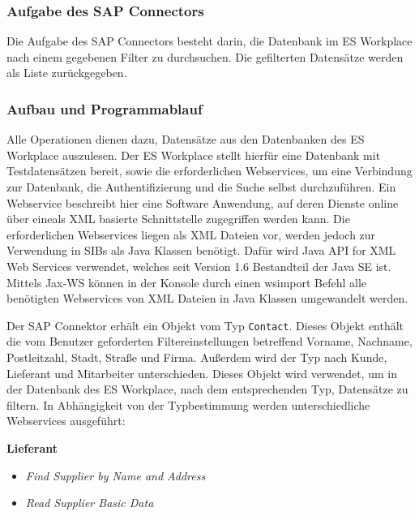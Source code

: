 \javalstset{}{}
\subsubsection{Aufgabe des SAP Connectors}

Die Aufgabe des SAP Connectors besteht darin, die Datenbank im ES Workplace nach einem 
gegebenen Filter zu durchsuchen. Die gefilterten Datensätze werden als Liste zurückgegeben. 

\subsubsection{Aufbau und Programmablauf}

Alle Operationen dienen dazu, Datensätze aus den Datenbanken des ES Workplace auszulesen. Der ES Workplace stellt hierfür 
eine Datenbank mit Testdatensätzen bereit, sowie die erforderlichen Webservices, um eine Verbindung zur Datenbank, 
die Authentifizierung und die Suche selbst durchzuführen. Ein Webservice beschreibt hier eine Software Anwendung, auf 
deren Dienste online über eineals XML basierte Schnittstelle zugegriffen werden kann. Die erforderlichen Webservices 
liegen als XML Dateien vor, werden jedoch zur Verwendung in SIBs als Java Klassen benötigt. Dafür wird Java API for XML Web 
Services verwendet, welches seit Version 1.6  Bestandteil der Java SE ist. Mittels Jax-WS können in der Konsole durch 
einen wsimport Befehl alle benötigten Webservices von XML Dateien in Java Klassen umgewandelt werden. 

Der SAP Connektor erhält ein Objekt vom Typ \lstinline{Contact}. Dieses Objekt enthält die vom Benutzer geforderten Filtereinstellungen 
betreffend Vorname, Nachname, Postleitzahl, Stadt, Straße und Firma. Außerdem wird der Typ nach Kunde, Lieferant und 
Mitarbeiter unterschieden. Dieses Objekt wird verwendet, um in der Datenbank des ES Workplace, nach dem entsprechenden Typ,
Datensätze zu filtern. In Abhängigkeit von der Typbestimmung werden unterschiedliche Webservices ausgeführt:

\textbf{Lieferant}
\begin{itemize}
\item \emph{Find Supplier by Name and Address}
\item \emph{Read Supplier Basic Data}
\end{itemize}

